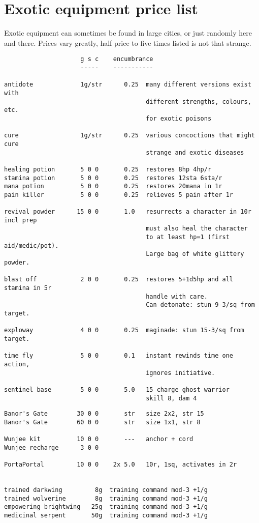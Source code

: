 \pagebreak[1]
\section*{Exotic equipment price list}

Exotic equipment can sometimes be found in large cities, or just randomly here and there. Prices vary greatly, half price to five times listed is not that strange.

\small
\begin{verbatim}
                     g s c    encumbrance
                     -----    -----------

antidote             1g/str      0.25  many different versions exist with
                                       different strengths, colours, etc.
                                       for exotic poisons

cure                 1g/str      0.25  various concoctions that might cure
                                       strange and exotic diseases

healing potion       5 0 0       0.25  restores 8hp 4hp/r
stamina potion       5 0 0       0.25  restores 12sta 6sta/r
mana potion          5 0 0       0.25  restores 20mana in 1r
pain killer          5 0 0       0.25  relieves 5 pain after 1r

revival powder      15 0 0       1.0   resurrects a character in 10r incl prep
                                       must also heal the character
                                       to at least hp=1 (first aid/medic/pot).
                                       Large bag of white glittery powder.

blast off            2 0 0       0.25  restores 5+1d5hp and all stamina in 5r
                                       handle with care.
                                       Can detonate: stun 9-3/sq from target.

exploway             4 0 0       0.25  maginade: stun 15-3/sq from target.

time fly             5 0 0       0.1   instant rewinds time one action, 
                                       ignores initiative.

sentinel base        5 0 0       5.0   15 charge ghost warrior
                                       skill 8, dam 4

\end{verbatim} \pagebreak[1] \begin{verbatim}
Banor's Gate        30 0 0       str   size 2x2, str 15
Banor's Gate        60 0 0       str   size 1x1, str 8

Wunjee kit          10 0 0       ---   anchor + cord
Wunjee recharge      3 0 0

PortaPortal         10 0 0    2x 5.0   10r, 1sq, activates in 2r


trained darkwing         8g  training command mod-3 +1/g
trained wolverine        8g  training command mod-3 +1/g
empowering brightwing   25g  training command mod-3 +1/g
medicinal serpent       50g  training command mod-3 +1/g

\end{verbatim}
